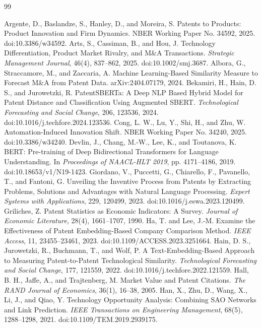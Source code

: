 \begin{thebibliography}{99}
\raggedright
{} Argente, D., Baslandze, S., Hanley, D., and Moreira, S. Patents to Products: Product Innovation and Firm Dynamics. NBER Working Paper No. 34592, 2025. doi:10.3386/w34592.
 Arts, S., Cassiman, B., and Hou, J. Technology Differentiation, Product Market Rivalry, and M\&A Transactions. \textit{Strategic Management Journal}, 46(4), 837--862, 2025. doi:10.1002/smj.3687.
 Albora, G., Straccamore, M., and Zaccaria, A. Machine Learning-Based Similarity Measure to Forecast M\&A from Patent Data. arXiv:2404.07179, 2024.
 Bekamiri, H., Hain, D. S., and Jurowetzki, R. PatentSBERTa: A Deep NLP Based Hybrid Model for Patent Distance and Classification Using Augmented SBERT. \textit{Technological Forecasting and Social Change}, 206, 123536, 2024. doi:10.1016/j.techfore.2024.123536.
 Cong, L. W., Lu, Y., Shi, H., and Zhu, W. Automation-Induced Innovation Shift. NBER Working Paper No. 34240, 2025. doi:10.3386/w34240.
 Devlin, J., Chang, M.-W., Lee, K., and Toutanova, K. BERT: Pre-training of Deep Bidirectional Transformers for Language Understanding. In \textit{Proceedings of NAACL-HLT 2019}, pp. 4171--4186, 2019. doi:10.18653/v1/N19-1423.
 Giordano, V., Puccetti, G., Chiarello, F., Pavanello, T., and Fantoni, G. Unveiling the Inventive Process from Patents by Extracting Problems, Solutions and Advantages with Natural Language Processing. \textit{Expert Systems with Applications}, 229, 120499, 2023. doi:10.1016/j.eswa.2023.120499.
 Griliches, Z. Patent Statistics as Economic Indicators: A Survey. \textit{Journal of Economic Literature}, 28(4), 1661--1707, 1990.
 Ha, T. and Lee, J.-M. Examine the Effectiveness of Patent Embedding-Based Company Comparison Method. \textit{IEEE Access}, 11, 23455--23461, 2023. doi:10.1109/ACCESS.2023.3251664.
 Hain, D. S., Jurowetzki, R., Buchmann, T., and Wolf, P. A Text-Embedding-Based Approach to Measuring Patent-to-Patent Technological Similarity. \textit{Technological Forecasting and Social Change}, 177, 121559, 2022. doi:10.1016/j.techfore.2022.121559.
 Hall, B. H., Jaffe, A., and Trajtenberg, M. Market Value and Patent Citations. \textit{The RAND Journal of Economics}, 36(1), 16--38, 2005.
 Han, X., Zhu, D., Wang, X., Li, J., and Qiao, Y. Technology Opportunity Analysis: Combining SAO Networks and Link Prediction. \textit{IEEE Transactions on Engineering Management}, 68(5), 1288--1298, 2021. doi:10.1109/TEM.2019.2939175.

\end{thebibliography}
